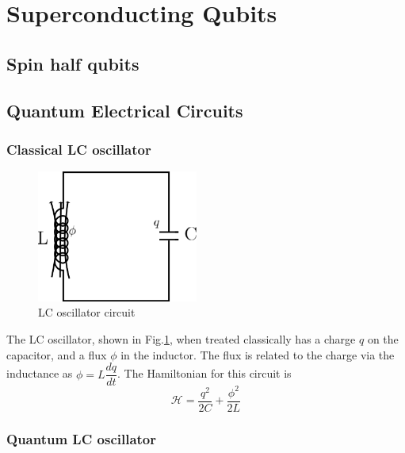 \section{Superconducting Qubits}

\subsection{Spin half qubits}

\subsection{Quantum Electrical Circuits}

\subsubsection{Classical LC oscillator}

\begin{figure}
\centering
\includegraphics[width=150pt]{Figures/LC_oscillator}
\decoRule
\caption[LC oscillator]{LC oscillator circuit}
\label{fig:LC oscillator}
\end{figure}

The LC oscillator, shown in Fig.\ref{fig:LC oscillator}, when treated classically has a charge $q$ on the capacitor, and a flux $\phi$ in the inductor. The flux is related to the charge via the inductance as $\phi=L\dfrac{dq}{dt}$. The Hamiltonian for this circuit is
\begin{equation}
\mathcal{H}=\frac{q^2}{2C}+\frac{\phi^2}{2L}
\end{equation}

\subsubsection{Quantum LC oscillator}

